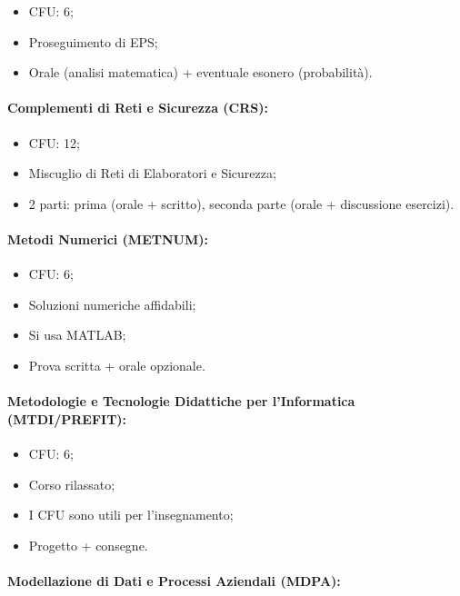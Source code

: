 \begin{itemize}
  \item CFU: 6;
  \item Proseguimento di EPS;
  \item Orale (analisi matematica) + eventuale esonero (probabilità).
\end{itemize}

\paragraph{Complementi di Reti e Sicurezza (CRS):}

\begin{itemize}
  \item CFU: 12;
  \item Miscuglio di Reti di Elaboratori e Sicurezza;
  \item 2 parti: prima (orale + scritto), seconda parte (orale + discussione esercizi).
\end{itemize}

\paragraph{Metodi Numerici (METNUM):}

\begin{itemize}
  \item CFU: 6;
  \item Soluzioni numeriche affidabili;
  \item Si usa MATLAB;
  \item Prova scritta + orale opzionale.
\end{itemize}

\paragraph{Metodologie e Tecnologie Didattiche per l'Informatica (MTDI/PREFIT):}

\begin{itemize}
  \item CFU: 6;
  \item Corso rilassato;
  \item I CFU sono utili per l'insegnamento;
  \item Progetto + consegne.
\end{itemize}

\paragraph{Modellazione di Dati e Processi Aziendali (MDPA):}

